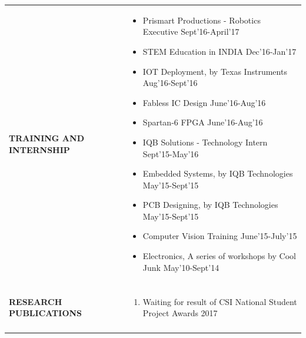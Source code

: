 \documentclass[a4paper]{article}
\begin{document}
\begin{longtable}{@{}m{3.0cm}m{14cm}@{}}
			
			\textrm{\textbf{TRAINING \newline AND \newline  INTERNSHIP}} & 
				\begin{itemize}
					\itemsep -2pt
					\item
					Prismart Productions - Robotics Executive \hfill  Sept'16-April'17
					\item
					STEM Education in INDIA \hfill  Dec'16-Jan'17
					\item
					IOT Deployment, by Texas Instruments \hfill  Aug'16-Sept'16
					\item
					Fabless IC Design \hfill  June'16-Aug'16
					\item
					Spartan-6 FPGA \hfill  June'16-Aug'16
					\item
					IQB Solutions - Technology Intern \hfill  Sept'15-May'16
					\item
					Embedded Systems, by IQB Technologies \hfill  May'15-Sept'15
					\item
					PCB Designing, by IQB Technologies \hfill  May'15-Sept'15
					\item
					Computer Vision Training \hfill  June'15-July'15
					\item
					Electronics, A series of workshops by Cool Junk \hfill  May'10-Sept'14
				\end{itemize}
			\\ \\
			
			
			\textrm{\textbf {RESEARCH \newline PUBLICATIONS}} & 
				\begin{enumerate}
					\itemsep -2pt
					\item
					Waiting for result of CSI National Student Project Awards 2017
				\end{enumerate}
			\\ \\
			

\end{longtable}
\end{document}
